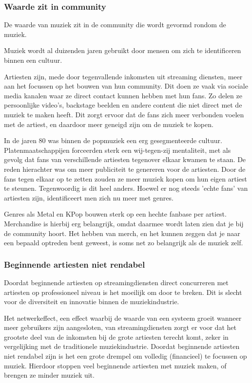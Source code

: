 \subsubsection*{Waarde zit in community}
\begin{quotebox}
De waarde van muziek zit in de community die wordt gevormd rondom de muziek.
\end{quotebox}

Muziek wordt al duizenden jaren gebruikt door mensen om zich te identificeren binnen een cultuur.

Artiesten zijn, mede door tegenvallende inkomsten uit streaming diensten, meer aan het focussen op het bouwen van hun community. Dit doen ze vaak via sociale media kanalen waar ze direct contact kunnen hebben met hun fans. Zo delen ze persoonlijke video's, backstage beelden en andere content die niet direct met de muziek te maken heeft. Dit zorgt ervoor dat de fans zich meer verbonden voelen met de artiest, en daardoor meer geneigd zijn om de muziek te kopen.

In de jaren 80 was binnen de popmuziek een erg gesegmenteerde cultuur. Platenmaatschappijen forceerden sterk een wij-tegen-zij mentaliteit, met als gevolg dat fans van verschillende artiesten tegenover elkaar kwamen te staan. De reden hierachter was om meer publiciteit te genereren voor de artiesten. Door de fans tegen elkaar op te zetten zouden ze meer muziek kopen om hun eigen artiest te steunen. Tegenwoordig is dit heel anders. Hoewel er nog steeds 'echte fans' van artiesten zijn, identificeert men zich nu meer  met genres.

Genres als Metal en KPop bouwen sterk op een hechte fanbase per artiest. Merchandise is hierbij erg belangrijk, omdat daarmee wordt laten zien dat je bij de community hoort. Het hebben van merch, en het kunnen zeggen dat je naar een bepaald optreden bent geweest, is soms net zo belangrijk als de muziek zelf.

\subsubsection*{Beginnende artiesten niet rendabel}
\begin{quotebox}
Doordat beginnende artiesten op streamingdiensten direct concurreren met artiesten op professioneel niveau is het moeilijk om door te breken. Dit is slecht voor de diversiteit en innovatie binnen de muziekindustrie.
\end{quotebox}

Het netwerkeffect, een effect waarbij de waarde van een systeem groeit wanneer meer gebruikers zijn aangesloten, van streamingdiensten zorgt er voor dat het grootste deel van de inkomsten bij de grote artiesten terecht komt, zeker in vergelijking met de traditionele muziekindustrie. Doordat beginnende artiesten niet rendabel zijn is het een grote drempel om volledig (financieel) te focussen op muziek. Hierdoor stoppen veel beginnende artiesten met muziek maken, of brengen ze minder muziek uit.

